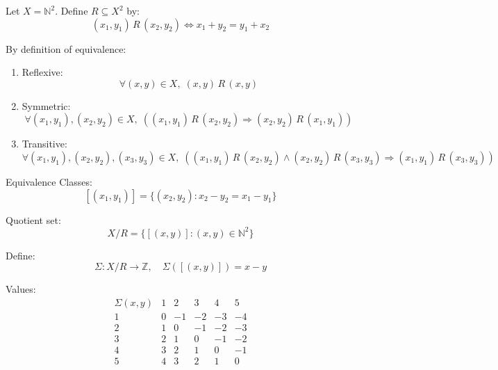 \documentclass[12pt,a4paper,openany]{article}
\begin{document}
Let $X = \mathbb{N}^2$. Define $R \subseteq X^2$ by:
$$(x_1,y_1) \,R\, (x_2,y_2) \iff x_1 + y_2 = y_1 + x_2$$

By definition of equivalence:

\begin{enumerate}
\item Reflexive:
   \[\forall (x,y) \in X, \; (x,y) \,R\, (x,y)\]

\item Symmetric:
   \[\forall (x_1,y_1),(x_2,y_2) \in X, \; ((x_1,y_1) \,R\, (x_2,y_2) \Rightarrow (x_2,y_2) \,R\, (x_1,y_1))\]

\item Transitive:
   \[\forall (x_1,y_1),(x_2,y_2),(x_3,y_3) \in X, \; ((x_1,y_1) \,R\, (x_2,y_2) \wedge (x_2,y_2) \,R\, (x_3,y_3) \Rightarrow (x_1,y_1) \,R\, (x_3,y_3))\]
\end{enumerate}

Equivalence Classes:
\[[(x_1,y_1)] = \{(x_2,y_2) : x_2 - y_2 = x_1 - y_1\}\]

Quotient set:
\[X/R = \{[(x,y)] : (x,y) \in \mathbb{N}^2\}\]

Define:
\[\Sigma: X/R \to \mathbb{Z}, \quad \Sigma([(x,y)]) = x - y\]

Values:
\[
\begin{array}{c|ccccc} 
\Sigma(x,y) & 1 & 2 & 3 & 4 & 5 \\
\hline
1 & 0 & -1 & -2 & -3 & -4 \\
2 & 1 & 0 & -1 & -2 & -3 \\
3 & 2 & 1 & 0 & -1 & -2 \\
4 & 3 & 2 & 1 & 0 & -1 \\
5 & 4 & 3 & 2 & 1 & 0 \\
\end{array}
\]
\end{document}
